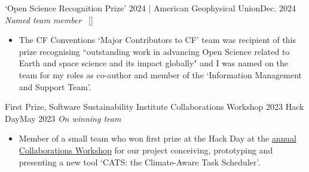 \begin{talks}

\projecta
	{`Open Science Recognition Prize' 2024 | American Geophysical Union}{Dec. 2024}
	{
	    \textit{Named team member}~ [\href{https://www.agu.org/user-profile?cstkey=0fc4a399-6049-4787-8dc4-c57c91b8a26f}{\small{\websiteSymbol}}]
	}
	{\begin{itemize}
     \item The CF Conventions `Major Contributors to CF' team was recipient of this prize recognising ``outstanding work in advancing Open Science related to Earth and space science and its impact globally" and I was named on the team for my roles as co-author and member of the `Information Management and Support Team'.
     \end{itemize}}
     
\projecta
	{First Prize, Software Sustainability Institute Collaborations Workshop 2023 Hack Day}{May 2023}
	{
	    \textit{On winning team}
	}
	{\begin{itemize}
     \item Member of a small team who won first prize at the Hack Day at the \href{https://www.software.ac.uk/workshop/collaborations-workshop-2023-cw23-0}{annual Collaborations Workshop} for our project conceiving, prototyping and presenting a new tool `CATS: the Climate-Aware Task Scheduler'.
     \end{itemize}}


\end{talks}
